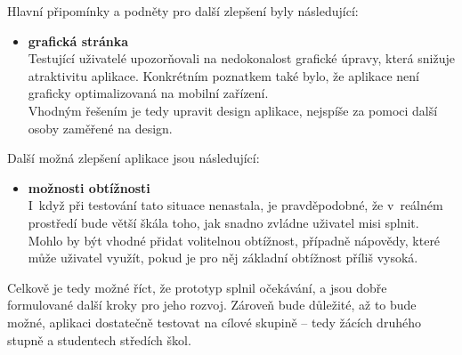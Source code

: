 Hlavní připomínky a podněty pro další zlepšení byly následující:

\begin{itemize}
	\item \textbf{grafická stránka}\\
	Testující uživatelé upozorňovali na nedokonalost grafické úpravy, která snižuje atraktivitu aplikace.
	Konkrétním poznatkem také bylo, že aplikace není graficky optimalizovaná na mobilní zařízení.\\  
	Vhodným řešením je tedy upravit design aplikace, nejspíše za pomoci další osoby zaměřené na design.
\end{itemize}

Další možná zlepšení aplikace jsou následující:
\begin{itemize}
	\item \textbf{možnosti obtížnosti}\\
	I~když při testování tato situace nenastala, je pravděpodobné, že v~reálném prostředí bude větší škála toho, jak snadno zvládne uživatel misi splnit. Mohlo by být vhodné přidat volitelnou obtížnost, případně nápovědy, které může uživatel využít, pokud je pro něj základní obtížnost příliš vysoká.
\end{itemize}

Celkově je tedy možné říct, že prototyp splnil očekávání, a jsou dobře formulované další kroky pro jeho rozvoj.
Zároveň bude důležité, až to bude možné, aplikaci dostatečně testovat na cílové skupině -- tedy žácích druhého stupně a studentech středích škol.   
